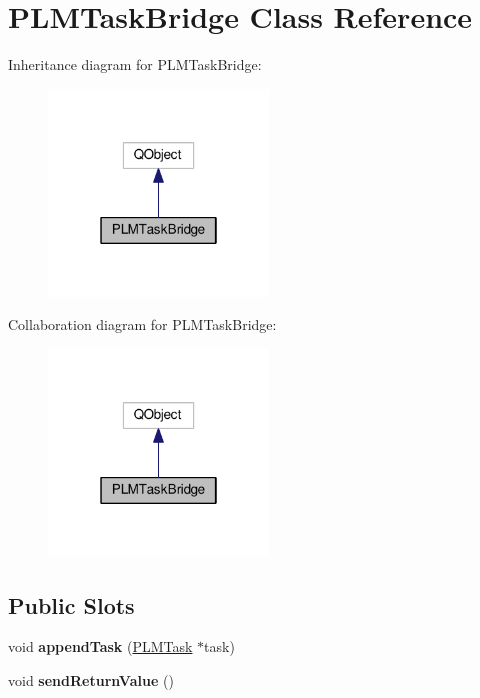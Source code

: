 \hypertarget{class_p_l_m_task_bridge}{}\section{P\+L\+M\+Task\+Bridge Class Reference}
\label{class_p_l_m_task_bridge}


Inheritance diagram for P\+L\+M\+Task\+Bridge\+:\nopagebreak
\begin{figure}[H]
\begin{center}
\leavevmode
\includegraphics[width=166pt]{class_p_l_m_task_bridge__inherit__graph}
\end{center}
\end{figure}


Collaboration diagram for P\+L\+M\+Task\+Bridge\+:\nopagebreak
\begin{figure}[H]
\begin{center}
\leavevmode
\includegraphics[width=166pt]{class_p_l_m_task_bridge__coll__graph}
\end{center}
\end{figure}
\subsection*{Public Slots}
\begin{DoxyCompactItemize}
\item 
void {\bfseries append\+Task} (\hyperlink{class_p_l_m_task}{P\+L\+M\+Task} $\ast$task)\hypertarget{class_p_l_m_task_bridge_af4a7b8e57da51a1bcd691844599ae3ac}{}\label{class_p_l_m_task_bridge_af4a7b8e57da51a1bcd691844599ae3ac}

\item 
void {\bfseries send\+Return\+Value} ()\hypertarget{class_p_l_m_task_bridge_ab48afaf8e7a8ef318623be1da97b2981}{}\label{class_p_l_m_task_bridge_ab48afaf8e7a8ef318623be1da97b2981}

\end{DoxyCompactItemize}
